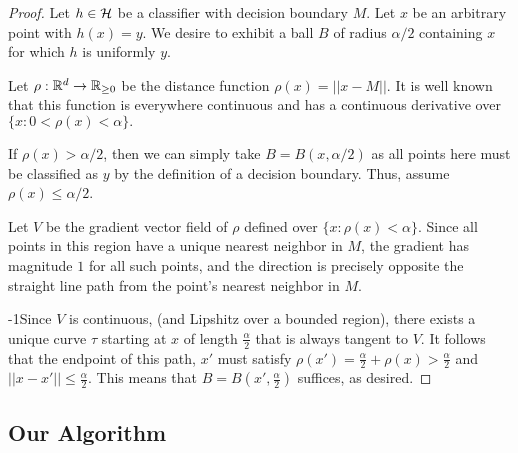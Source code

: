 \begin{proof}
Let  $h \in \mathcal H$ be a classifier with decision boundary $M$. Let $x$ be an arbitrary point with $h(x) = y$. We desire to exhibit a ball $B$ of radius $\alpha/2$ containing $x$ for which $h$ is uniformly $y$. 

Let $\rho: \mathbb{R}^d \to \mathbb{R}_{\geq 0}$ be the distance function $\rho(x) = ||x - M||$. It is well known that this function is everywhere continuous and has a continuous derivative over $\{x: 0 < \rho(x) < \alpha\}.$

If $\rho(x) > \alpha/2$, then we can simply take $B= B(x, \alpha/2)$ as all points here must be classified as $y$ by the definition of a decision boundary. Thus, assume $\rho(x) \leq \alpha/2$. 

Let $V$ be the gradient vector field of $\rho$ defined over $\{x: \rho(x) < \alpha\}$. Since all points in this region have a unique nearest neighbor in $M$, the gradient has magnitude $1$ for all such points, and the direction is precisely opposite the straight line path from the point's nearest neighbor in $M$. 

\looseness-1Since $V$ is continuous, (and Lipshitz over a bounded region), there exists a unique curve $\tau$ starting at $x$ of length $\frac{\alpha}{2}$ that is always tangent to $V$. It follows that the endpoint of this path, $x'$ must satisfy $\rho(x') = \frac{\alpha}{2} + \rho(x) > \frac{\alpha}{2}$ and $||x - x'|| \leq \frac{\alpha}{2}$. This means that $B = B(x', \frac{\alpha}{2})$ suffices, as desired. 
\end{proof}

\vspace{-5mm}
\subsection{Our Algorithm} 

